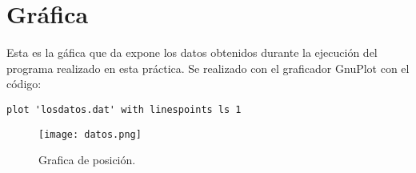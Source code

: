 \documentclass{article}
\begin{document}
\section{Gráfica}
Esta es la gáfica que da expone los datos obtenidos durante la ejecución del programa realizado en esta práctica.
Se realizado con el graficador GnuPlot con el código:
\begin{verbatim}
plot 'losdatos.dat' with linespoints ls 1

\end{verbatim}
\begin{figure}
  \texttt{[image: datos.png]}
  \caption{Grafica de posición.}
  \label{fig:boat1}
\end{figure}
\end{document}
